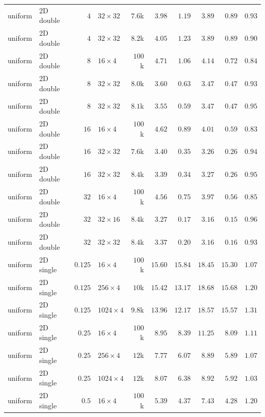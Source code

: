 {\begin{longtable}{llrlrrrrrr}
    uniform & 2D double & $4$ & $32{\times}32$ & $7.6$k & $3.98$ & $1.19$ & $3.89$ & $0.89$ & $0.93$ \\
    uniform & 2D double & $4$ & $32{\times}32$ & $8.2$k & $4.05$ & $1.23$ & $3.89$ & $0.89$ & $0.90$ \\
    uniform & 2D double & $8$ & $16{\times}4$ & $100$k & $4.71$ & $1.06$ & $4.14$ & $0.72$ & $0.84$ \\
    uniform & 2D double & $8$ & $32{\times}32$ & $8.0$k & $3.60$ & $0.63$ & $3.47$ & $0.47$ & $0.93$ \\
    uniform & 2D double & $8$ & $32{\times}32$ & $8.1$k & $3.55$ & $0.59$ & $3.47$ & $0.47$ & $0.95$ \\
    uniform & 2D double & $16$ & $16{\times}4$ & $100$k & $4.62$ & $0.89$ & $4.01$ & $0.59$ & $0.83$ \\
    uniform & 2D double & $16$ & $32{\times}32$ & $7.6$k & $3.40$ & $0.35$ & $3.26$ & $0.26$ & $0.94$ \\
    uniform & 2D double & $16$ & $32{\times}32$ & $8.4$k & $3.39$ & $0.34$ & $3.27$ & $0.26$ & $0.95$ \\
    uniform & 2D double & $32$ & $16{\times}4$ & $100$k & $4.56$ & $0.75$ & $3.97$ & $0.56$ & $0.85$ \\
    uniform & 2D double & $32$ & $32{\times}16$ & $8.4$k & $3.27$ & $0.17$ & $3.16$ & $0.15$ & $0.96$ \\
    uniform & 2D double & $32$ & $32{\times}32$ & $8.4$k & $3.37$ & $0.20$ & $3.16$ & $0.16$ & $0.93$ \\
    \midrule
    uniform & 2D single & $0.125$ & $16{\times}4$ & $100$k & $15.60$ & $15.84$ & $18.45$ & $15.30$ & $1.07$ \\
    uniform & 2D single & $0.125$ & $256{\times}4$ & $10$k & $15.42$ & $13.17$ & $18.68$ & $15.68$ & $1.20$ \\
    uniform & 2D single & $0.125$ & $1024{\times}4$ & $9.8$k & $13.96$ & $12.17$ & $18.57$ & $15.57$ & $1.31$ \\
    uniform & 2D single & $0.25$ & $16{\times}4$ & $100$k & $8.95$ & $8.39$ & $11.25$ & $8.09$ & $1.11$ \\
    uniform & 2D single & $0.25$ & $256{\times}4$ & $12$k & $7.77$ & $6.07$ & $8.89$ & $5.89$ & $1.07$ \\
    uniform & 2D single & $0.25$ & $1024{\times}4$ & $12$k & $8.07$ & $6.38$ & $8.92$ & $5.92$ & $1.03$ \\
    uniform & 2D single & $0.5$ & $16{\times}4$ & $100$k & $5.39$ & $4.37$ & $7.43$ & $4.28$ & $1.20$ \\

\end{longtable}}

